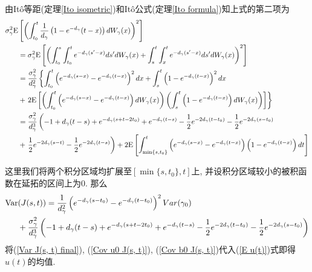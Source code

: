 \documentclass[notitlepage,cs4size,punct,oneside]{ctexrep}
\numberwithin{equation}{section}
\theoremstyle{mystyle}
\begin{document}
由It\^{o}等距(定理\ref{Ito isometric})和It\^{o}公式(定理\ref{Ito formula})知上式的第二项为
\[
\begin{split}
\sigma_\gamma^2\text{E}&\left[\left(\int_{t_0}^t \frac{1}{d_\gamma}\left(1-e^{-d_\gamma}(t-x)\right)dW_\gamma(x)\right)^2\right] \\
&= \sigma_\gamma^2\text{E}\left[\left(\int_{t_0}^{s}\int_{t_0}^{t}e^{-d_\gamma(s'-x)}ds'dW_\gamma(x)+\int_s^t\int_x^t e^{-d_\gamma(s'-x)}ds'dW_\gamma(x)\right)^2\right] \\
&= \frac{\sigma_\gamma^2}{d_\gamma^2}\left\{\int_{t_0}^t \left(e^{-d_\gamma(s-x)}-e^{-d_\gamma(t-x)}\right)^2dx+\int_{s}^t\left(1-e^{-d_\gamma(t-x)}\right)^2dx\right. \\
&+\left.2\text{E}\left[\left(\int_{t_0}^t \left(e^{-d_\gamma(s-x)}-e^{-d_\gamma(t-x)}\right)dW_\gamma(x)\right)\left(\int_{s}^t\left(1-e^{-d_\gamma(t-x)}\right)dW_\gamma(x)\right)\right]\right\} \\
&= \frac{\sigma_\gamma^2}{d_\gamma^3}\left(-1+d_\gamma(t-s)+e^{-d_\gamma(s+t-2t_0)}+e^{-d_\gamma(t-s)}-\frac{1}{2}e^{-2d_\gamma(t-t_0)}-\frac{1}{2}e^{-2d_\gamma(s-t_0)}\right. \\
&+ \left.\frac{1}{2}e^{-2d_\gamma(s-t)}-\frac{1}{2}e^{-2d_\gamma(t-s)}\right) + 2\text{E}\left[\int_{\min\{s, t_0\}}^t\left(e^{-d_\gamma(s-x)}-e^{-d_\gamma(t-x)}\right)\left(1-e^{-d_\gamma(t-x)}\right)dt\right]
\end{split}
\]

这里我们将两个积分区域均扩展至$[\min\{s, t_0\}, t]$上, 并设积分区域较小的被积函数在延拓的区间上为0. 那么
\begin{equation} \label{Var J(s, t) final}
\begin{split}
\text{Var}&(J(s, t)) = \frac{1}{d_\gamma^2}\left(e^{-d_\gamma(s-t_0)}-e^{-d_\gamma(t-t_0)}\right)^2Var(\gamma_0) \\
&+ \frac{\sigma_\gamma^2}{d_\gamma^3}\left(-1+d_\gamma(t-s)+e^{-d_\gamma(s+t-2t_0)}+e^{-d_\gamma(t-s)}-\frac{1}{2}e^{-2d_\gamma(t-t_0)}-\frac{1}{2}e^{-2d_\gamma(s-t_0)}\right) 
\end{split}
\end{equation}
将(\ref{Var J(s, t) final}), (\ref{Cov u0 J(s, t)}), (\ref{Cov b0 J(s, t)})代入(\ref{E u(t)})式即得$u(t)$的均值.
\end{document}

